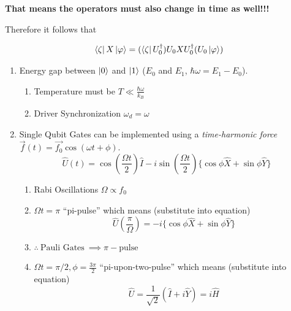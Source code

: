 \documentclass[reprint, amsmath,amssymb, aps]{revtex4-2}
\begin{document}
            \textbf{That means the operators must also change in time as well!!!}

            Therefore it follows that 

            \begin{align*}
                \bra{\zeta}X\ket{\varphi} = (\bra{\zeta}U_0^\dagger)U_0 X U_0^\dagger (U_0\ket{\varphi})
            \end{align*}

            \begin{enumerate}
                \item Energy gap between $\ket{0}$ and $\ket{1}$ ($E_0$ and $E_1$, $\hbar\omega=E_1-E_0$).
                \begin{enumerate}
                    \item Temperature must be $T\ll \frac{\hbar\omega}{k_B}$
                    \item Driver Synchronization $\omega_d = \omega$
                \end{enumerate}
                \item Single Qubit Gates can be implemented using a \textit{time-harmonic force} $\vec{f}(t)=\vec{f_0}\cos(\omega t + \phi)$.
                \begin{equation*}
                    \hat{U}(t) = \cos\left(\frac{\Omega t}{2}\right)\hat{I} - i\sin\left(\frac{\Omega t}{2}\right)\{\cos\phi\hat{X} + \sin\phi\hat{Y}\}
                \end{equation*}
                \begin{enumerate}
                    \item Rabi Oscillations $\Omega \propto f_0$
                    \item $\Omega t = \pi$ ``pi-pulse'' which means (substitute into equation)
                    \begin{equation*}
                        \hat{U}\left(\frac{\pi}{\Omega}\right) = -i\{\cos\phi\hat{X} + \sin\phi\hat{Y}\}
                    \end{equation*}
                    \item $\therefore \ \text{Pauli Gates} \ \implies \pi-\text{pulse}$
                    \item $\Omega t = \pi/2, \phi = \frac{3\pi}{2}$ ``pi-upon-two-pulse'' which means (substitute into equation)
                    \begin{equation*}
                        \hat{U} = \frac{1}{\sqrt{2}}(\hat{I} + i\hat{Y}) = i\hat{H}
                    \end{equation*}

\end{enumerate}
\end{enumerate}
\end{document}
